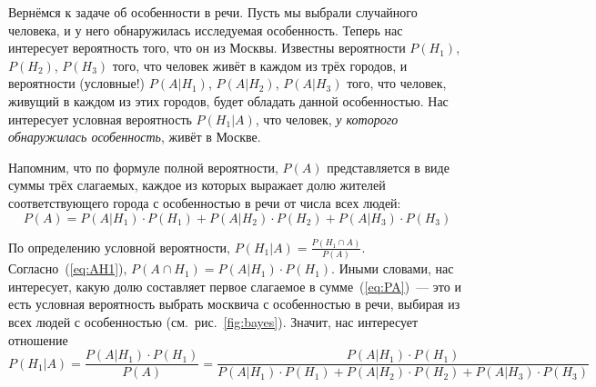 \documentclass[11pt]{article}
\begin{document}
Вернёмся к задаче об особенности в речи. Пусть мы выбрали случайного человека, и у
него обнаружилась исследуемая особенность. Теперь нас интересует вероятность того,
что он из Москвы. Известны вероятности $P(H_1)$, $P(H_2)$, $P(H_3)$ того, что
человек живёт в каждом из трёх городов, и вероятности (условные!) $P(A \vert H_1)$,
$P(A \vert H_2)$, $P(A \vert H_3)$ того, что человек, живущий в каждом из этих
городов, будет обладать данной особенностью. Нас интересует условная вероятность
$P(H_1 \vert A)$, что человек, \emph{у которого обнаружилась особенность}, живёт
в Москве.

Напомним, что по формуле полной вероятности, $P(A)$ представляется в виде суммы
трёх слагаемых, каждое из которых выражает долю жителей соответствующего города
с особенностью в речи от числа всех людей:
\begin{equation}\label{eq:PA}
	P(A)
    =P(A \vert H_1) \cdot P(H_1)+P(A \vert H_2) \cdot P(H_2)+P(A \vert H_3) \cdot P(H_3)
\end{equation}

По определению условной вероятности, $P(H_1 \vert A) = \frac{P(H_1 \cap A)}{P(A)}$.
Согласно~(\ref{eq:AH1}), $P(A \cap H_1)=P(A \vert H_1) \cdot P(H_1)$. Иными
словами, нас интересует, какую долю составляет первое слагаемое в
сумме~(\ref{eq:PA})~--- это и есть условная вероятность выбрать москвича с
особенностью в речи, выбирая из всех людей с особенностью (см.~рис.~\ref{fig:bayes}).
Значит, нас интересует отношение
\begin{equation*}
	P(H_1 \vert A)
    = \frac{P(A \vert H_1) \cdot P(H_1)}{P(A)}
    = \frac{P(A \vert H_1) \cdot P(H_1)}{P(A \vert H_1)\cdot
	P(H_1)+P(A \vert H_2) \cdot P(H_2)+P(A \vert H_3) \cdot P(H_3)}
\end{equation*}
\end{document}
